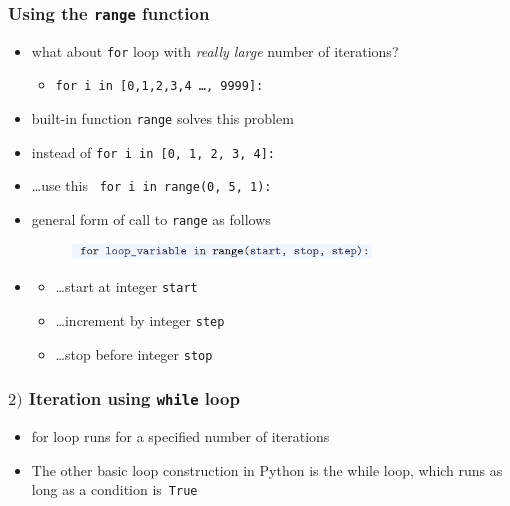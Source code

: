 \documentclass[english,14pt]{beamer}
\newcommand\red[1]{{\color{red} #1}}
\newcommand{\xmark}{\ding{55}}%
\begin{document}
\begin{frame}[fragile]

\frametitle{Using the \texttt{range} function}

\begin{itemize}
	\item what about \texttt{for} loop with \emph{really large} number of iterations?
	\begin{itemize}
		\item[\red{\xmark}] \texttt{for i in [0,1,2,3,4 \ldots, 9999]:}
	\end{itemize}
	
	\item built-in function \texttt{range} solves this problem
	
	\item instead of \verb+for i in [0, 1, 2, 3, 4]:+

	\item \ldots use this~ \verb+for i in range(0, 5, 1):+
	
	\item general form of call to \texttt{range} as follows
	\begin{figure}[ht]
		\centering
		\includegraphics[width=0.75\textwidth]{figures/LLp64c}
	\end{figure}
	\item[]%
	\begin{itemize}
		\item \ldots start at integer \texttt{start}
		\item[] \qquad\ldots increment by integer \texttt{step}
		\item[] \qquad\qquad\ldots stop before integer \texttt{stop}
	\end{itemize}

\end{itemize}

\end{frame}


\begin{frame}[fragile]

\frametitle{$2)$ Iteration using \texttt{while} loop}

\begin{itemize}
	\item for loop runs for a specified number of iterations
	\item The other basic loop construction in Python is the while loop, which runs as long as a condition is~\texttt{True}

\end{itemize}

\end{frame}
\end{document}
